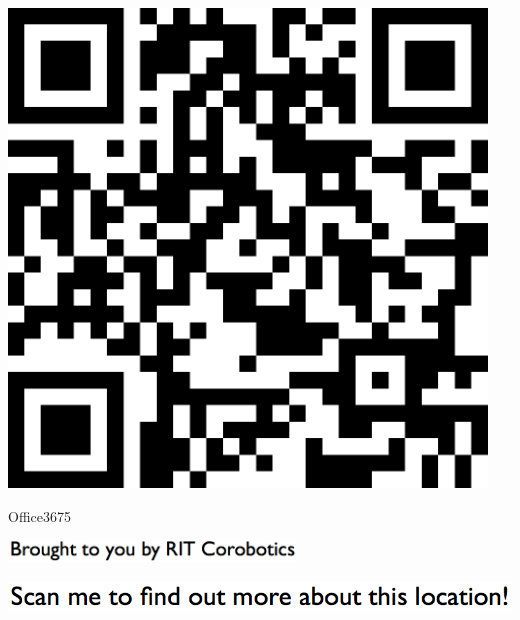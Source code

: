 \documentclass[letterpaper]{article}
\begin{document}
 \begingroup 
 \centerline{\includegraphics[scale=1,width=5in,height=5in]{Office3675.png}} 
 \endgroup 
 \vspace*{\fill} 

 \hfill{\small Office3675} 

  \vspace{0.7in} 
 
 \centerline{\includegraphics[scale=1,width=3in]{text-bottom.png}} 
 
 \pagebreak 
{} 
 \vspace*{\fill} 
 
  \centerline{\includegraphics[scale=1,width=6in]{text-top.png}} 
 
 \vspace{0.5in} 
 
\end{document}
